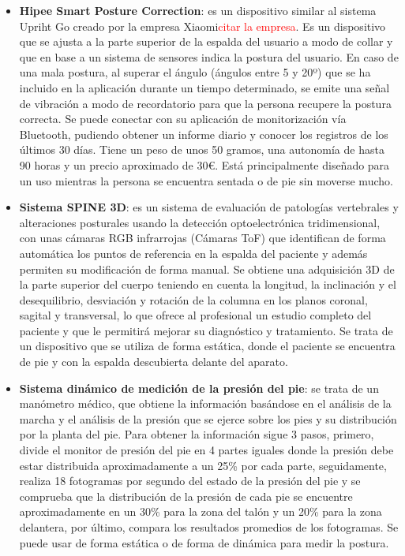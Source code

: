 \begin{itemize}
    
    \item \textbf{Hipee Smart Posture Correction}\cite{Hipee1,Hipee2}: es un dispositivo similar al sistema Upriht Go creado por la empresa Xiaomi\textcolor{red}{citar la empresa}. Es un dispositivo que se ajusta a la parte superior de la espalda del usuario a modo de collar y que en base a un sistema de sensores indica la postura del usuario. En caso de una mala postura, al superar el ángulo (ángulos entre 5 y 20º) que se ha incluido en la aplicación durante un tiempo determinado, se emite una señal de vibración a modo de recordatorio para que la persona recupere la postura correcta. Se puede conectar con su aplicación de monitorización vía Bluetooth, pudiendo obtener un informe diario y conocer los registros de los últimos 30 días. Tiene un peso de unos 50 gramos, una autonomía de hasta 90 horas y un precio aproximado de 30€. Está principalmente diseñado para un uso mientras la persona se encuentra sentada o de pie sin moverse mucho. 

    \item \textbf{Sistema SPINE 3D}\cite{SPINE3D}: es un sistema de evaluación de patologías vertebrales y alteraciones posturales usando la detección optoelectrónica tridimensional, con unas cámaras RGB infrarrojas (Cámaras ToF) que identifican de forma automática los puntos de referencia en la espalda del paciente y además permiten su modificación de forma manual. Se obtiene una adquisición 3D de la parte superior del cuerpo teniendo en cuenta la longitud, la inclinación y el desequilibrio, desviación y rotación de la columna en los planos coronal, sagital y transversal, lo que ofrece al profesional un estudio completo del paciente y que le permitirá mejorar su diagnóstico y tratamiento. Se trata de un dispositivo que se utiliza de forma estática, donde el paciente se encuentra de pie y con la espalda descubierta delante del aparato. 

    \item \textbf{Sistema dinámico de medición de la presión del pie}\cite{SisDinPresionPie}: se trata de un manómetro médico, que obtiene la información basándose en el análisis de la marcha y el análisis de la presión que se ejerce sobre los pies y su distribución por la planta del pie. Para obtener la información sigue 3 pasos, primero, divide el monitor de presión del pie en 4 partes iguales donde la presión debe estar distribuida aproximadamente a un 25\% por cada parte, seguidamente, realiza 18 fotogramas por segundo del estado de la presión del pie y se comprueba que la distribución de la presión de cada pie se encuentre aproximadamente en un 30\% para la zona del talón y un 20\% para la zona delantera, por último, compara los resultados promedios de los fotogramas. Se puede usar de forma estática o de forma de dinámica para medir la postura. 


\end{itemize}
